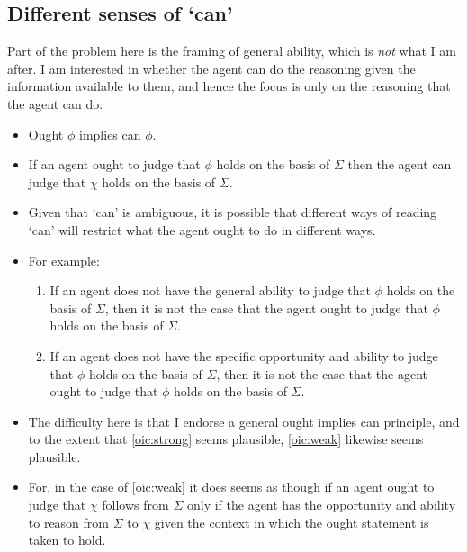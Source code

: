 \documentclass[10pt]{article}
\begin{document}
\subsection{Different senses of `can'}
\label{sec:different-senses-can}

{
  \color{red}
  Part of the problem here is the framing of general ability, which is \emph{not} what I am after.
  I am interested in whether the agent can do the reasoning given the information available to them, and hence the focus is only on the reasoning that the agent can do.
}

\begin{itemize}
\item Ought \(\phi\) implies can \(\phi\).
\item If an agent ought to judge that \(\phi\) holds on the basis of \(\Sigma\) then the agent can judge that \(\chi\) holds on the basis of \(\Sigma\).
\end{itemize}

\begin{itemize}
\item Given that `can' is ambiguous, it is possible that different ways of reading `can' will restrict what the agent ought to do in different ways.
\item For example:
  \begin{enumerate}
  \item\label{oic:strong} If an agent does not have the general ability to judge that \(\phi\) holds on the basis of \(\Sigma\), then it is not the case that the agent ought to judge that \(\phi\) holds on the basis of \(\Sigma\).
  \item\label{oic:weak} If an agent does not have the specific opportunity and ability to judge that \(\phi\) holds on the basis of \(\Sigma\), then it is not the case that the agent ought to judge that \(\phi\) holds on the basis of \(\Sigma\).
  \end{enumerate}
\end{itemize}

\begin{itemize}
\item The difficulty here is that I endorse a general ought implies can principle, and to the extent that \ref{oic:strong} seems plausible, \ref{oic:weak} likewise seems plausible.
\item For, in the case of \ref{oic:weak} it does seems as though if an agent ought to judge that \(\chi\) follows from \(\Sigma\) only if the agent has the opportunity and ability to reason from \(\Sigma\) to \(\chi\) given the context in which the ought statement is taken to hold.
\end{itemize}
\end{document}
